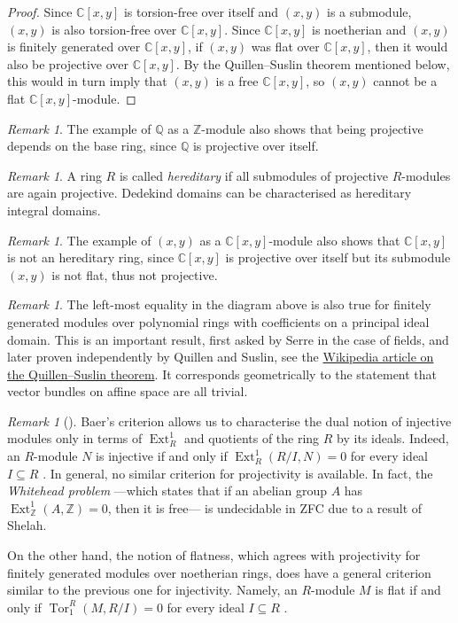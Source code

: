 \documentclass[A4paper, 12pt, british, reqno]{amsart}
\newcommand{\C}{\mathbb{C}} %
\newcommand{\Q}{\mathbb{Q}} %
\newcommand{\Z}{\mathbb{Z}} %
\theoremstyle{plain}
\theoremstyle{definition}
\theoremstyle{remark}
\newtheorem{rem}[thm]{Remark}
\theoremstyle{plain}
\theoremstyle{definition}
\theoremstyle{remark}
\theoremstyle{plain}
\theoremstyle{definition}
\theoremstyle{remark}
\DeclareMathOperator{\Ext}{Ext}
\DeclareMathOperator{\Tor}{Tor}
\begin{document}
{\begin{proof}
    Since $\C[x,y]$ is torsion-free over itself and $(x,y)$ is a submodule, $(x,y)$ is also torsion-free over $\C[x,y]$.
    Since $\C[x,y]$ is noetherian and $(x,y)$ is finitely generated over $\C[x,y]$, if $(x,y)$ was flat over $\C[x,y]$, then it would also be projective over $\C[x,y]$.
    By the Quillen--Suslin theorem mentioned below, this would in turn imply that $(x,y)$ is a free $\C[x,y]$, so $(x,y)$ cannot be a flat $\C[x,y]$-module.
\end{proof}

\begin{rem}
    The example of $\Q$ as a $\Z$-module also shows that being projective depends on the base ring, since $\Q$ is projective over itself.
\end{rem}

\begin{rem}
    A ring $R$ is called \textit{hereditary} if all submodules of projective $R$-modules are again projective.
    Dedekind domains can be characterised as hereditary integral domains.
\end{rem}

\begin{rem}
    The example of $(x,y)$ as a $\C[x,y]$-module also shows that $\C[x,y]$ is not an hereditary ring, since $\C[x,y]$ is projective over itself but its submodule $(x,y)$ is not flat, thus not projective.
\end{rem}

\begin{rem}
    The left-most equality in the diagram above is also true for finitely generated modules over polynomial rings with coefficients on a principal ideal domain.
    This is an important result, first asked by Serre in the case of fields, and later proven independently by Quillen and Suslin, see the \href{https://en.wikipedia.org/wiki/Quillen-Suslin_theorem}{Wikipedia article on the Quillen--Suslin theorem}.
    It corresponds geometrically to the statement that vector bundles on affine space are all trivial.
\end{rem}

\begin{rem}[{\cite{fra18}}]
    Baer's criterion \cite[Prop.~1.1.1]{fra18} allows us to characterise the dual notion of injective modules only in terms of $\Ext^{1}_{R}$ and quotients of the ring $R$ by its ideals.
    Indeed, an $R$-module $N$ is injective if and only if $\Ext^{1}_{R}(R/I,N)=0$ for every ideal $I\subseteq R$ \cite[Prop.~1.1.4]{fra18}.
    In general, no similar criterion for projectivity is available.
    In fact, the \textit{Whitehead problem} ---which states that if an abelian group $A$ has $\Ext^{1}_{\Z}(A,\Z)=0$, then it is free--- is undecidable in ZFC due to a result of Shelah.

    On the other hand, the notion of flatness, which agrees with projectivity for finitely generated modules over noetherian rings, does have a general criterion similar to the previous one for injectivity.
    Namely, an $R$-module $M$ is flat if and only if $\Tor_{1}^{R}(M,R/I)=0$ for every ideal $I\subseteq R$ \cite[Prop.~1.2.3]{fra18}.
\end{rem}
}
\end{document}

